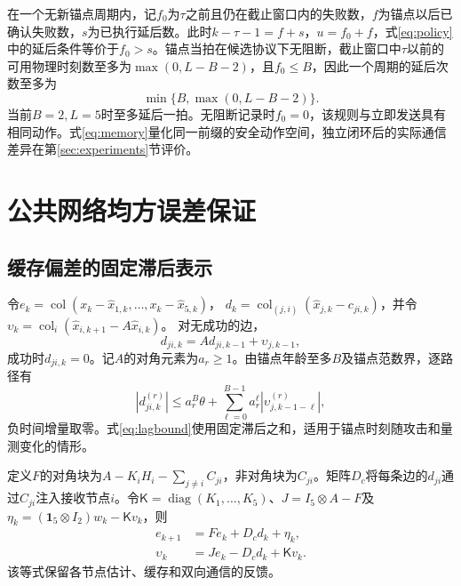 \documentclass[UTF8,a4paper,zihao=5,fontset=windows]{ctexart}
\newcommand{\col}{\operatorname{col}}
\newcommand{\diag}{\operatorname{diag}}
\begin{document}
在一个无新锚点周期内，记$f_0$为$\tau$之前且仍在截止窗口内的失败数，$f$为锚点以后已确认失败数，$s$为已执行延后数。此时$k-\tau-1=f+s$，$u=f_0+f$，式\eqref{eq:policy}中的延后条件等价于$f_0>s$。锚点当拍在候选协议下无阻断，截止窗口中$\tau$以前的可用物理时刻数至多为$\max(0,L-B-2)$，且$f_0\le B$，因此一个周期的延后次数至多为
\begin{equation}
\min\{B,\max(0,L-B-2)\}.
\label{eq:cycle}
\end{equation}
当前$B=2,L=5$时至多延后一拍。无阻断记录时$f_0=0$，该规则与立即发送具有相同动作。式\eqref{eq:memory}量化同一前缀的安全动作空间，独立闭环后的实际通信差异在第\ref{sec:experiments}节评价。

\section{公共网络均方误差保证}
\subsection{缓存偏差的固定滞后表示}
令$e_k=\col(x_k-\hat x_{1,k},\ldots,x_k-\hat x_{5,k})$，
$d_k=\col_{(j,i)}(\hat x_{j,k}-c_{ji,k})$，并令
$\upsilon_k=\col_i(\hat x_{i,k+1}-A\hat x_{i,k})$。
对无成功的边，
\begin{equation}
d_{ji,k}=Ad_{ji,k-1}+\upsilon_{j,k-1},
\label{eq:cache_recursion}
\end{equation}
成功时$d_{ji,k}=0$。记$A$的对角元素为$a_r\ge1$。由锚点年龄至多$B$及锚点范数界，逐路径有
\begin{equation}
|d_{ji,k}^{(r)}|
\le a_r^B\theta+
\sum_{\ell=0}^{B-1}a_r^\ell
|\upsilon_{j,k-1-\ell}^{(r)}|,
\label{eq:lagbound}
\end{equation}
负时间增量取零。式\eqref{eq:lagbound}使用固定滞后之和，适用于锚点时刻随攻击和量测变化的情形。

定义$F$的对角块为$A-K_iH_i-\sum_{j\ne i}C_{ji}$，非对角块为$C_{ji}$。矩阵$D_c$将每条边的$d_{ji}$通过$C_{ji}$注入接收节点$i$。令$\mathsf K=\diag(K_1,\ldots,K_5)$、$J=I_5\otimes A-F$及$\eta_k=(\mathbf1_5\otimes I_2)w_k-\mathsf K v_k$，则
\begin{equation}
\begin{aligned}
e_{k+1}&=Fe_k+D_c d_k+\eta_k,\\
\upsilon_k&=Je_k-D_c d_k+\mathsf K v_k.
\end{aligned}
\label{eq:error}
\end{equation}
该等式保留各节点估计、缓存和双向通信的反馈。
\end{document}
